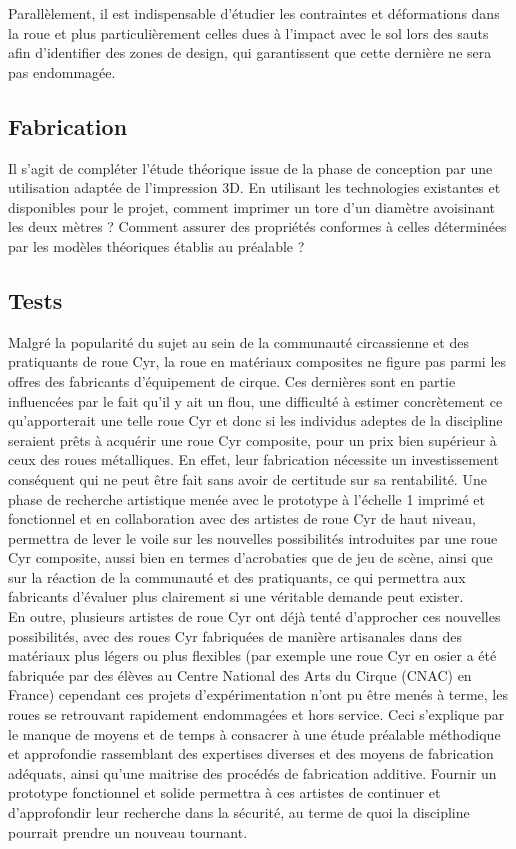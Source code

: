 Parallèlement, il est indispensable d’étudier les contraintes et déformations dans la roue et plus particulièrement celles dues à l’impact avec le sol lors des sauts afin d’identifier des zones de design, qui garantissent que cette dernière ne sera pas endommagée.

\subsection{Fabrication}
Il s’agit de compléter l’étude théorique issue de la phase de conception par une utilisation adaptée de l’impression 3D. En utilisant les technologies existantes et disponibles pour le projet, comment imprimer un tore d’un diamètre avoisinant les deux mètres ? Comment assurer des propriétés conformes à celles déterminées par les modèles théoriques établis au préalable ? 

\subsection{Tests}
Malgré la popularité du sujet au sein de la communauté circassienne et des pratiquants de roue Cyr, la roue en matériaux composites ne figure pas parmi les offres des fabricants d’équipement de cirque. Ces dernières sont en partie influencées par le fait qu’il y ait un flou, une difficulté à estimer concrètement ce qu’apporterait une telle roue Cyr et donc si les individus adeptes de la discipline seraient prêts à acquérir une roue Cyr composite, pour un prix bien supérieur à ceux des roues métalliques. En effet, leur fabrication nécessite un investissement conséquent qui ne peut être fait sans avoir de certitude sur sa rentabilité. Une phase de recherche artistique menée avec le prototype à l’échelle 1 imprimé et fonctionnel et en collaboration avec des artistes de roue Cyr de haut niveau, permettra de lever le voile sur les nouvelles possibilités introduites par une roue Cyr composite, aussi bien en termes d'acrobaties que de jeu de scène, ainsi que sur la réaction de la communauté et des pratiquants, ce qui permettra aux fabricants d'évaluer plus clairement si une véritable demande peut exister.\\
En outre, plusieurs artistes de roue Cyr ont déjà tenté d'approcher ces nouvelles possibilités, avec des roues Cyr fabriquées de manière artisanales dans des matériaux plus légers ou plus flexibles (par exemple une roue Cyr en osier a été fabriquée par des élèves au Centre National des Arts du Cirque (CNAC) en France)
cependant ces projets d'expérimentation n'ont pu être menés à terme, les roues se retrouvant rapidement endommagées et hors service. Ceci s'explique par le manque de moyens et de temps à consacrer à une étude préalable méthodique et approfondie rassemblant des expertises diverses et des moyens de fabrication adéquats, ainsi qu'une maitrise des procédés de fabrication additive. Fournir un prototype fonctionnel et solide permettra à ces artistes de continuer et d'approfondir leur recherche dans la sécurité, au terme de quoi la discipline pourrait prendre un nouveau tournant.\\


